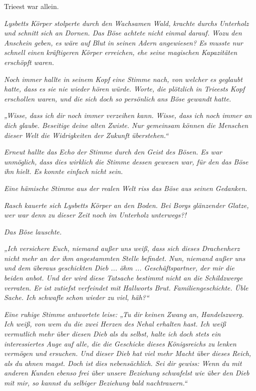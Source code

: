 Trieest war allein.\bigskip







\textit{Lysbetts Körper stolperte durch den Wachsamen Wald, krachte durchs Unterholz und schnitt sich an Dornen. Das Böse achtete nicht einmal darauf. Wozu den Anschein geben, es wäre auf Blut in seinen Adern angewiesen? Es musste nur schnell einen kräftigeren Körper erreichen, ehe seine magischen Kapazitäten erschöpft waren.}

\textit{Noch immer hallte in seinem Kopf eine Stimme nach, von welcher es geglaubt hatte, dass es sie nie wieder hören würde. Worte, die plötzlich in Trieests Kopf erschollen waren, und die sich doch so persönlich ans Böse gewandt hatte.}

\textit{„Wisse, dass ich dir noch immer verzeihen kann. Wisse, dass ich noch immer an dich glaube. Beseitige deine alten Zwiste. Nur gemeinsam können die Menschen dieser Welt die Widrigkeiten der Zukunft überstehen.“}

\textit{Erneut hallte das Echo der Stimme durch den Geist des Bösen. Es war unmöglich, dass dies wirklich die Stimme dessen gewesen war, für den das Böse ihn hielt. Es konnte einfach nicht sein.}

\textit{Eine hämische Stimme aus der realen Welt riss das Böse aus seinen Gedanken.}

\textit{Rasch kauerte sich Lysbetts Körper an den Boden. Bei Borgs glänzender Glatze, wer war denn zu dieser Zeit noch im Unterholz unterwegs?!}

\textit{Das Böse lauschte.}

\textit{„Ich versichere Euch, niemand außer uns weiß, dass sich dieses Drachenherz nicht mehr an der ihm angestammten Stelle befindet. Nun, niemand außer uns und dem überaus geschickten Dieb ... öhm ... Geschäftspartner, der mir die beiden anbot. Und der wird diese Tatsache bestimmt nicht an die Schildzwerge verraten. Er ist zutiefst verfeindet mit Hallworts Brut. Familiengeschichte. Üble Sache. Ich schwafle schon wieder zu viel, häh?“}

\textit{Eine ruhige Stimme antwortete leise: „Tu dir keinen Zwang an, Handelszwerg. Ich weiß, von wem du die zwei Herzen des Nehal erhalten hast. Ich weiß vermutlich mehr über diesen Dieb als du selbst, halte ich doch stets ein interessiertes Auge auf alle, die die Geschicke dieses Königsreichs zu lenken vermögen und ersuchen. Und dieser Dieb hat viel mehr Macht über dieses Reich, als du ahnen magst. Doch ist dies nebensächlich. Sei dir gewiss: Wenn du mit anderen Kunden ebenso frei über unsere Beziehung schwafelst wie über den Dieb mit mir, so kannst du selbiger Beziehung bald nachtrauern.“}

